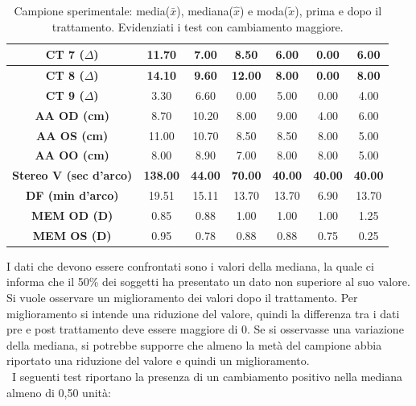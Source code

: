 \begin{table}[H]
\begin{center}
\begin{tabular}{|c|c|c|c|c|c|c|}
\textbf{CT 7 ($\Delta$)} & \textbf{11.70} & \textbf{7.00} & \textbf{8.50} & \textbf{6.00} & \textbf{0.00} & \textbf{6.00} \\ \hline
\textbf{CT 8 ($\Delta$)} & \textbf{14.10} & \textbf{9.60} & \textbf{12.00} & \textbf{8.00} & \textbf{0.00} & \textbf{8.00} \\ \hline
\textbf{CT 9 ($\Delta$)} & 3.30 & 6.60 & 0.00 & 5.00 & 0.00 & 4.00 \\ \hline
\textbf{AA OD (cm)} & 8.70 & 10.20 & 8.00 & 9.00 & 4.00 & 6.00 \\ \hline
\textbf{AA OS (cm)} & 11.00 & 10.70 & 8.50 & 8.50 & 8.00 & 5.00 \\ \hline
\textbf{AA OO (cm)} & 8.00 & 8.90 & 7.00 & 8.00 & 8.00 & 5.00\\ \hline
\textbf{Stereo V (sec d'arco)} & \textbf{138.00} & \textbf{44.00} & \textbf{70.00} & \textbf{40.00} & \textbf{40.00} & \textbf{40.00}\\ \hline
\textbf{DF (min d'arco)} & 19.51 & 15.11 & 13.70 & 13.70 & 6.90 & 13.70 \\ \hline
\textbf{MEM OD (D)} & 0.85 & 0.88 & 1.00 & 1.00 & 1.00 & 1.25 \\ \hline
\textbf{MEM OS (D)} & 0.95 & 0.78 & 0.88 & 0.88 & 0.75 & 0.25 \\ \hline

\hline
\end{tabular}
\end{center}
\caption[Campione sperimentale: $\bar{x}$, ($\hat{x}$, $\tilde{x}$, prima e dopo il trattamento]{Campione sperimentale: media($\bar{x}$), mediana($\hat{x}$) e moda($\tilde{x}$), prima e dopo il trattamento. Evidenziati i test con cambiamento maggiore.}
\end{table}

I dati che devono essere confrontati sono i valori della mediana, la quale ci informa che il 50\% dei soggetti ha presentato un dato non superiore al suo valore. Si vuole osservare un miglioramento dei valori dopo il trattamento. Per miglioramento si intende una riduzione del valore, quindi la differenza tra i dati pre e post trattamento deve essere maggiore di 0. Se si osservasse una variazione della mediana, si potrebbe supporre che almeno la metà del campione abbia riportato una riduzione del valore e quindi un miglioramento. 
\\\
I seguenti test riportano la presenza di un cambiamento positivo nella mediana almeno di 0,50 unità:

